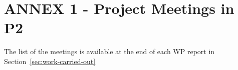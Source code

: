 %

\section{ANNEX 1 - Project Meetings in P2}
\label{section:project_meetings}

The list of the meetings is available at the end of each WP report in Section~\ref{sec:work-carried-out}